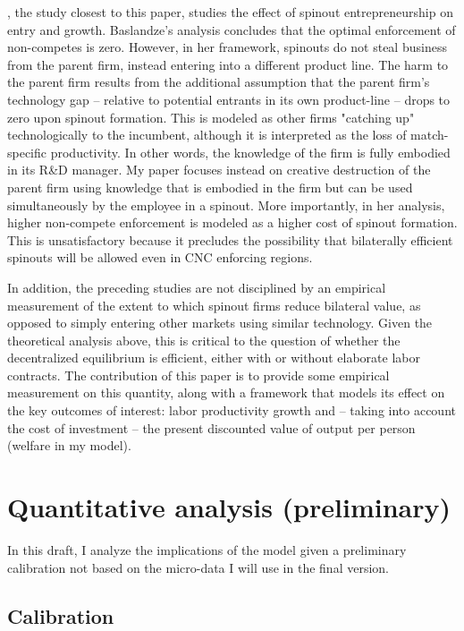 \documentclass[12pt,english]{article}
\theoremstyle{remark}
\begin{document}
\cite{baslandze_spinout_2019}, the study closest to this paper, studies the effect of spinout entrepreneurship on entry and growth. Baslandze's analysis concludes that the optimal enforcement of non-competes is zero. However, in her framework, spinouts do not steal business from the parent firm, instead entering into a different product line. The harm to the parent firm results from the additional assumption that the parent firm's technology gap -- relative to potential entrants in its own product-line -- drops to zero upon spinout formation. This is modeled as other firms "catching up" technologically to the incumbent, although it is interpreted as the loss of match-specific productivity. In other words, the knowledge of the firm is fully embodied in its R\&D manager. My paper focuses instead on creative destruction of the parent firm using knowledge that is embodied in the firm but can be used simultaneously by the employee in a spinout.  More importantly, in her analysis, higher non-compete enforcement is modeled as a higher cost of spinout formation. This is unsatisfactory because it precludes the possibility that bilaterally efficient spinouts will be allowed even in CNC enforcing regions. 

In addition, the preceding studies are not disciplined by an empirical measurement of the extent to which spinout firms reduce bilateral value, as opposed to simply entering other markets using similar technology. Given the theoretical analysis above, this is critical to the question of whether the decentralized equilibrium is efficient, either with or without elaborate labor contracts. The contribution of this paper is to provide some empirical measurement on this quantity, along with a framework that models its effect on the key outcomes of interest: labor productivity growth and -- taking into account the cost of investment -- the present discounted value of output per person (welfare in my model).



\section{Quantitative analysis (preliminary)}\label{quantitative_analysis}

In this draft, I analyze the implications of the model given a preliminary calibration not based on the micro-data I will use in the final version.

\subsection{Calibration}
\end{document}
